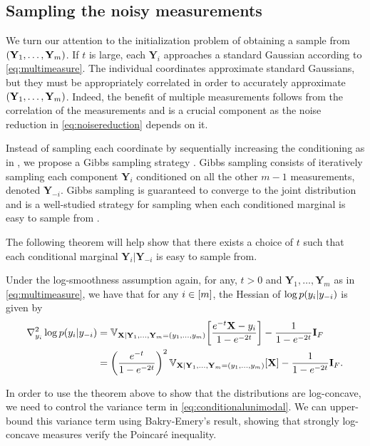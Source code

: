 \subsection{Sampling the noisy measurements}
We turn our attention to the initialization problem of obtaining a sample from  $\mathopen{}\left(\mathbf{Y}_1, \dots, \mathbf{Y}_m\right)$. If $t$ is large, each $\mathbf{Y}_i$ approaches a standard Gaussian according to \eqref{eq:multimeasure}. The individual coordinates approximate standard Gaussians, but they must be appropriately correlated in order to accurately approximate $\mathopen{}\left(\mathbf{Y}_1, \dots, \mathbf{Y}_m\right)$. Indeed, the benefit of multiple measurements follows from the correlation of the measurements and is a crucial component as the noise reduction in \eqref{eq:noisereduction} depends on it. 

Instead of sampling each coordinate by sequentially increasing the conditioning as in \cite{saremi_chain_2024}, we propose a Gibbs sampling strategy \cite{casella_explaining_1992, roberts_updating_1997}. Gibbs sampling consists of iteratively sampling each component $\mathbf{Y}_i$ conditioned on all the other $m-1$ measurements, denoted $\mathbf{Y}_{-i}$. Gibbs sampling is guaranteed to converge to the joint distribution \cite{rosenthal_minorization_1995} and is a well-studied strategy for sampling when each conditioned marginal is easy to sample from \cite{koller_probabilistic_2009}. 

The following theorem will help show that there exists a choice of $t$ such that each conditional marginal $\mathbf{Y}_i|\mathbf{Y}_{-i}$ is easy to sample from. 

\begin{theorem}
\label{thm:unimodality_conditional}
    Under the log-smoothness assumption again, for any, $t>0$ and $\mathbf{Y}_1, \dots, \mathbf{Y}_m$ as in \eqref{eq:multimeasure}, we have that for any  $i \in \mathopen{}\left[m\right]$, the Hessian of $\log p\mathopen{}\left(y_i|y_{-i}\right)$ is given by
    \begin{align}
    \begin{split}
    \nabla^2_{y_i} \log p\mathopen{}\left(y_i|y_{-i}\right) &= \mathbb{V}_{\mathbf{X}|\mathbf{Y}_1, \dots, \mathbf{Y}_m = (y_1, \dots, y_m)}\mathopen{}\left[\frac{e^{-t} \mathbf{X} - y_i}{1 - e^{-2t}}\right] - \frac{1}{1-e^{-2t}}\mathbf{I}_F \\
    &= \mathopen{}\left(\frac{e^{-t}}{1 - e^{-2t}}\right)^2\mathbb{V}_{\mathbf{X}|\mathbf{Y}_1, \dots, \mathbf{Y}_m =(y_1, \dots, y_m)}\mathopen{}\left[\mathbf{X}\right] - \frac{1}{1-e^{-2t}}\mathbf{I}_F.
    \end{split}
    \end{align}
    \label{eq:conditionalunimodal}
\end{theorem}
In order to use the theorem above to show that the distributions are log-concave, we need to control the variance term in \eqref{eq:conditionalunimodal}. We can upper-bound this variance term using Bakry-Emery's result, showing that strongly log-concave measures verify the Poincaré inequality.

